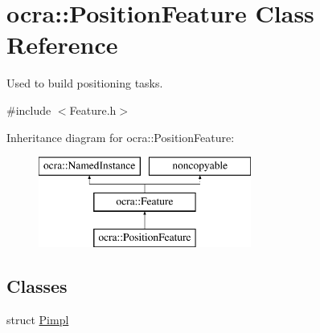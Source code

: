 \hypertarget{classocra_1_1PositionFeature}{}\section{ocra\+:\+:Position\+Feature Class Reference}
\label{classocra_1_1PositionFeature}


Used to build positioning tasks.  




{\ttfamily \#include $<$Feature.\+h$>$}

Inheritance diagram for ocra\+:\+:Position\+Feature\+:\begin{figure}[H]
\begin{center}
\leavevmode
\includegraphics[height=3.000000cm]{d7/d01/classocra_1_1PositionFeature}
\end{center}
\end{figure}
\subsection*{Classes}
\begin{DoxyCompactItemize}
\item 
struct \hyperlink{structocra_1_1PositionFeature_1_1Pimpl}{Pimpl}
\end{DoxyCompactItemize}
